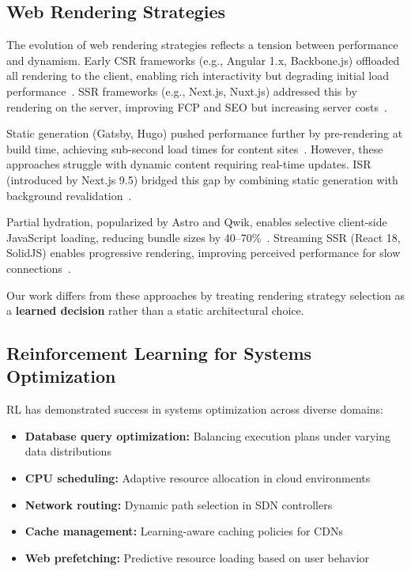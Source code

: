 \documentclass[10pt,twocolumn]{article}
\begin{document}
\subsection{Web Rendering Strategies}

The evolution of web rendering strategies reflects a tension between performance and dynamism. Early CSR frameworks (e.g., Angular 1.x, Backbone.js) offloaded all rendering to the client, enabling rich interactivity but degrading initial load performance~\cite{hanafi2024comparison}. SSR frameworks (e.g., Next.js, Nuxt.js) addressed this by rendering on the server, improving FCP and SEO but increasing server costs~\cite{vercel2024nextjs}.

Static generation (Gatsby, Hugo) pushed performance further by pre-rendering at build time, achieving sub-second load times for content sites~\cite{ollila2022modern}. However, these approaches struggle with dynamic content requiring real-time updates. ISR (introduced by Next.js 9.5) bridged this gap by combining static generation with background revalidation~\cite{lazuardy2022modern}.

Partial hydration, popularized by Astro and Qwik, enables selective client-side JavaScript loading, reducing bundle sizes by 40--70\%~\cite{miller2019islands}. Streaming SSR (React 18, SolidJS) enables progressive rendering, improving perceived performance for slow connections~\cite{react2022react18}.

Our work differs from these approaches by treating rendering strategy selection as a \textbf{learned decision} rather than a static architectural choice.

\subsection{Reinforcement Learning for Systems Optimization}

RL has demonstrated success in systems optimization across diverse domains:

\begin{itemize}[nosep]
\item \textbf{Database query optimization:} Balancing execution plans under varying data distributions~\cite{kraska2018case}
\item \textbf{CPU scheduling:} Adaptive resource allocation in cloud environments~\cite{gaddam2022react18}
\item \textbf{Network routing:} Dynamic path selection in SDN controllers~\cite{mao2021reinforcement}
\item \textbf{Cache management:} Learning-aware caching policies for CDNs
\item \textbf{Web prefetching:} Predictive resource loading based on user behavior
\end{itemize}
\end{document}
